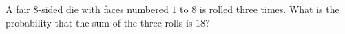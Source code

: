 A fair $8$-sided die with faces numbered $1$ to $8$ is rolled three times. What is the probability that the sum of the three rolls is $18$?
